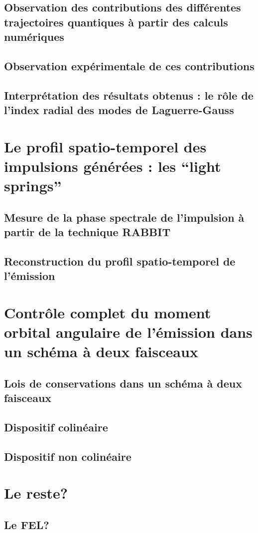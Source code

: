 \subsection{Observation des contributions des différentes trajectoires quantiques à partir des calculs numériques}
\subsection{Observation expérimentale de ces contributions}
\subsection{Interprétation des résultats obtenus : le rôle de l'index radial des modes de Laguerre-Gauss}

\section{Le profil spatio-temporel des impulsions générées : les ``light springs''}
\subsection{Mesure de la phase spectrale de l'impulsion à partir de la technique RABBIT}
\subsection{Reconstruction du profil spatio-temporel de l'émission}

\section{Contrôle complet du moment orbital angulaire de l'émission dans un schéma à deux faisceaux}
\subsection{Lois de conservations dans un schéma à deux faisceaux}
\subsection{Dispositif colinéaire}
\subsection{Dispositif non colinéaire}

\section{Le reste?}
\subsection{Le FEL?}